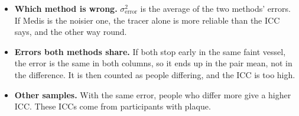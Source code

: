 \documentclass[11pt]{article}
\begin{document}
\begin{itemize}
  \item \textbf{Which method is wrong.} $\sigma^2_{\text{error}}$ is the average of the two methods' errors. If
    Medis is the noisier one, the tracer alone is more reliable than the ICC says, and the other way round.
  \item \textbf{Errors both methods share.} If both stop early in the same faint vessel, the error is the same in
    both columns, so it ends up in the pair mean, not in the difference. It is then counted as people differing,
    and the ICC is too high.
  \item \textbf{Other samples.} With the same error, people who differ more give a higher ICC. These ICCs come
    from participants with plaque.
\end{itemize}
\end{document}
